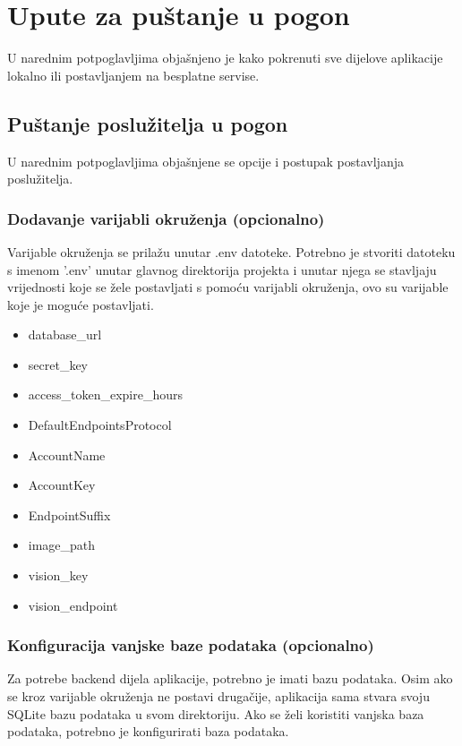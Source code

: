 			\eject 
		
		\section{Upute za puštanje u pogon}
		
			{U narednim potpoglavljima objašnjeno je kako pokrenuti sve dijelove aplikacije lokalno ili postavljanjem na besplatne servise.}
		
			\subsection{Puštanje poslužitelja u pogon}
			
			{U narednim potpoglavljima objašnjene se opcije i postupak postavljanja poslužitelja.}
			
			\subsubsection{Dodavanje varijabli okruženja (opcionalno)}
			
			{Varijable okruženja se prilažu unutar .env datoteke. Potrebno je stvoriti datoteku s imenom '.env' unutar glavnog direktorija projekta i unutar njega se stavljaju vrijednosti koje se žele postavljati s pomoću varijabli okruženja, ovo su varijable koje je moguće postavljati.}
			
			\begin{itemize}
				\item{database\_url}
				\item{secret\_key}
				\item{access\_token\_expire\_hours}
				\item{DefaultEndpointsProtocol}
				\item{AccountName}
				\item{AccountKey}
				\item{EndpointSuffix}
				\item{image\_path}
				\item{vision\_key}
				\item{vision\_endpoint}
			\end{itemize}
			
			\subsubsection{Konfiguracija vanjske baze podataka (opcionalno)}
			
			{Za potrebe backend dijela aplikacije, potrebno je imati bazu podataka. Osim ako se kroz varijable okruženja ne postavi drugačije, aplikacija sama stvara svoju SQLite bazu podataka u svom direktoriju. Ako se želi koristiti vanjska baza podataka, potrebno je konfigurirati baza podataka.}
			
